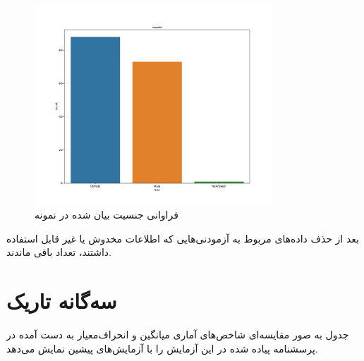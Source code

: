 
% 
\begin{figure}[htpb]
    \centering
    \includegraphics[width=0.8\textwidth]{./img/sexualityAgainstPopulation.pdf}
    \caption{فراوانی جنسیت بیان شده در نمونه}
    \label{fig:sexualityAgainstPopulation}
\end{figure}

بعد از حذف داده‌های مربوط به آزمودنی‌هایی که اطلاعات مخدوش یا غیر قابل استفاده داشتند، تعداد
\CleanedSampleSize
باقی ماندند.

\section{سه‌گانه تاریک}
جدول 
\CompareDarkTriadStatisticsRef
به صور مقایسه‌ای 
شاخص‌های آماری میانگین و انحراف‌معیار به دست آمده در پرسشنامه پیاده شده در این آزمایش 
را با آزمایش‌های پیشین نمایش می‌دهد. 

\CompareDarkTriadStatisticsCustomTableCommand


\begin{landscape}
\end{landscape}

